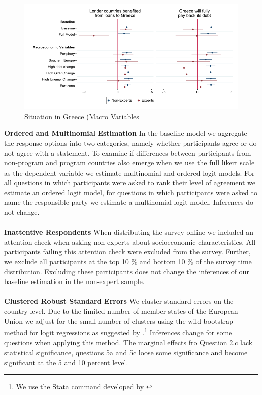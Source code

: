 \begin{figure}[h!]
    \begin{center}
     \caption{Situation in Greece (Macro Variables}
    \includegraphics[scale=1.2]{macro_S_1601_S_1701.pdf}
    \end{center}
    \tiny
\end{figure}
    \clearpage
\textbf{Ordered and Multinomial Estimation}
In the baseline model we aggregate the response options into two categories, namely whether participants agree or do not agree with a statement.  To examine if differences between participants from non-program and program countries also emerge when we use the full likert scale as the dependent variable we estimate multinomial and ordered logit models. For all questions in which participants were asked to rank their level of agreement we estimate an ordered logit model, for questions in which participants were asked to name the responsible party we estimate a multinomial logit model. Inferences do not change.\\

\\
\textbf{Inattentive Respondents}
When distributing the survey online we included an attention check when asking non-experts about socioeconomic characteristics. All participants failing this attention check were excluded from the survey. Further, we exclude all participants at the top 10 $\%$ and bottom 10 $\%$ of the survey time distribution. Excluding these participants does not change the inferences of our baseline estimation in the non-expert sample.\\


\\
\textbf{Clustered Robust Standard Errors} 
We cluster standard errors on the country level. Due to the limited number of member states of the European Union we adjust for the small number of clusters using the wild bootstrap method for logit regressions as suggested by \cite{cameron}.\footnote{We use the Stata command developed by \cite{roodman}} Inferences change for some questions when applying this method. The marginal effects fro Question 2.c lack statistical significance, questions 5a and 5c loose some significance and become significant at the 5 and 10 percent level.  \\

